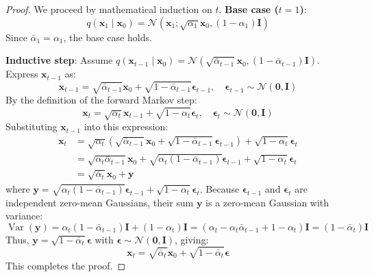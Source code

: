 \documentclass[11pt,a4paper]{article}
\theoremstyle{definition}
\begin{document}
\begin{proof}
We proceed by mathematical induction on $t$.
\textbf{Base case ($t = 1$)}:
{\boldmath
\begin{equation}
q(\mathbf{x}_1 \mid \mathbf{x}_0) = \mathcal{N}(\mathbf{x}_1; \sqrt{\alpha_1}\mathbf{x}_0, (1 - \alpha_1)\mathbf{I})
\end{equation}
}
Since $\bar{\alpha}_1 = \alpha_1$, the base case holds.

\textbf{Inductive step}: Assume $q(\mathbf{x}_{t-1} \mid \mathbf{x}_0) = \mathcal{N}(\sqrt{\bar{\alpha}_{t-1}}\mathbf{x}_0, (1 - \bar{\alpha}_{t-1})\mathbf{I})$. Express $\mathbf{x}_{t-1}$ as:
{\boldmath
\begin{equation}
\mathbf{x}_{t-1} = \sqrt{\bar{\alpha}_{t-1}}\mathbf{x}_0 + \sqrt{1 - \bar{\alpha}_{t-1}}\boldsymbol{\epsilon}_{t-1}, \quad \boldsymbol{\epsilon}_{t-1} \sim \mathcal{N}(\mathbf{0}, \mathbf{I})
\end{equation}
}
By the definition of the forward Markov step:
{\boldmath
\begin{equation}
\mathbf{x}_t = \sqrt{\alpha_t}\mathbf{x}_{t-1} + \sqrt{1 - \alpha_t}\boldsymbol{\epsilon}_t, \quad \boldsymbol{\epsilon}_t \sim \mathcal{N}(\mathbf{0}, \mathbf{I})
\end{equation}
}
Substituting $\mathbf{x}_{t-1}$ into this expression:
{\boldmath
\begin{align}
\mathbf{x}_t &= \sqrt{\alpha_t}\left( \sqrt{\bar{\alpha}_{t-1}}\mathbf{x}_0 + \sqrt{1 - \bar{\alpha}_{t-1}}\boldsymbol{\epsilon}_{t-1} \right) + \sqrt{1 - \alpha_t}\boldsymbol{\epsilon}_t \\
&= \sqrt{\alpha_t \bar{\alpha}_{t-1}}\mathbf{x}_0 + \sqrt{\alpha_t(1 - \bar{\alpha}_{t-1})}\boldsymbol{\epsilon}_{t-1} + \sqrt{1 - \alpha_t}\boldsymbol{\epsilon}_t \\
&= \sqrt{\bar{\alpha}_t}\mathbf{x}_0 + \mathbf{y}
\end{align}
}
where $\mathbf{y} = \sqrt{\alpha_t(1 - \bar{\alpha}_{t-1})}\boldsymbol{\epsilon}_{t-1} + \sqrt{1 - \alpha_t}\boldsymbol{\epsilon}_t$. Because $\boldsymbol{\epsilon}_{t-1}$ and $\boldsymbol{\epsilon}_t$ are independent zero-mean Gaussians, their sum $\mathbf{y}$ is a zero-mean Gaussian with variance:
{\boldmath
\begin{equation}
\operatorname{Var}(\mathbf{y}) = \alpha_t(1 - \bar{\alpha}_{t-1})\mathbf{I} + (1 - \alpha_t)\mathbf{I} = (\alpha_t - \alpha_t \bar{\alpha}_{t-1} + 1 - \alpha_t)\mathbf{I} = (1 - \bar{\alpha}_t)\mathbf{I}
\end{equation}
}
Thus, $\mathbf{y} = \sqrt{1 - \bar{\alpha}_t}\boldsymbol{\epsilon}$ with $\boldsymbol{\epsilon} \sim \mathcal{N}(\mathbf{0}, \mathbf{I})$, giving:
{\boldmath
\begin{equation}
\mathbf{x}_t = \sqrt{\bar{\alpha}_t}\mathbf{x}_0 + \sqrt{1 - \bar{\alpha}_t}\boldsymbol{\epsilon}
\end{equation}
}
This completes the proof.
\end{proof}
\end{document}
